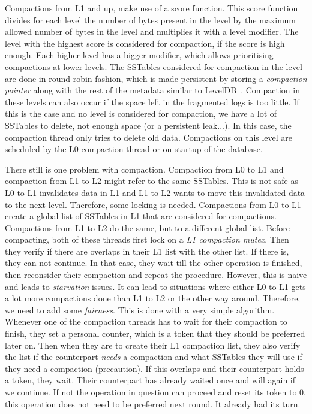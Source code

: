 Compactions from L1 and up, make use of a score function. This score function divides for each level the number of bytes present in the level by the maximum allowed number of bytes in the level and multiplies it with a level modifier. The level with the highest score is considered for compaction, if the score is high enough. Each higher level has a bigger modifier, which allows prioritising compactions at lower levels. The SSTables considered for compaction in the level are done in round-robin fashion, which is made persistent by storing a \textit{compaction pointer} along with the rest of the metadata similar to LevelDB~\cite{LevelDB}. Compaction in these levels can also occur if the space left in the fragmented logs is too little. If this is the case and no level is considered for compaction, we have a lot of SSTables to delete, not enough space (or a persistent leak...). In this case, the compaction thread only tries to delete old data. Compactions on this level are scheduled by the L0 compaction thread or on startup of the database.

There still is one problem with compaction. Compaction from L0 to L1 and compaction from L1 to L2 might refer to the same SSTables. This is not safe as L0 to L1 invalidates data in L1 and L1 to L2 wants to move this invalidated data to the next level. Therefore, some locking is needed. Compactions from L0 to L1 create a global list of SSTables in L1 that are considered for compactions. Compactions from L1 to L2 do the same, but to a different global list. Before compacting, both of these threads first lock on a \textit{L1 compaction mutex}. Then they verify if there are overlaps in their L1 list with the other list. If there is, they can not continue. In that case, they wait till the other operation is finished, then reconsider their compaction and repeat the procedure. However, this is naive and leads to \textit{starvation} issues. It can lead to situations where either L0 to L1 gets a lot more compactions done than L1 to L2 or the other way around. Therefore, we need to add some \textit{fairness}. This is done with a very simple algorithm. Whenever one of the compaction threads has to wait for their compaction to finish, they set a personal counter, which is a token that they should be preferred later on. Then when they are to create their L1 compaction list, they also verify the list if the counterpart \textit{needs} a compaction and what SSTables they will use if they need a compaction (precaution). If this overlaps and their counterpart holds a token, they wait. Their counterpart has already waited once and will again if we continue. If not the operation in question can proceed and reset its token to 0, this operation does not need to be preferred next round. It already had its turn.

